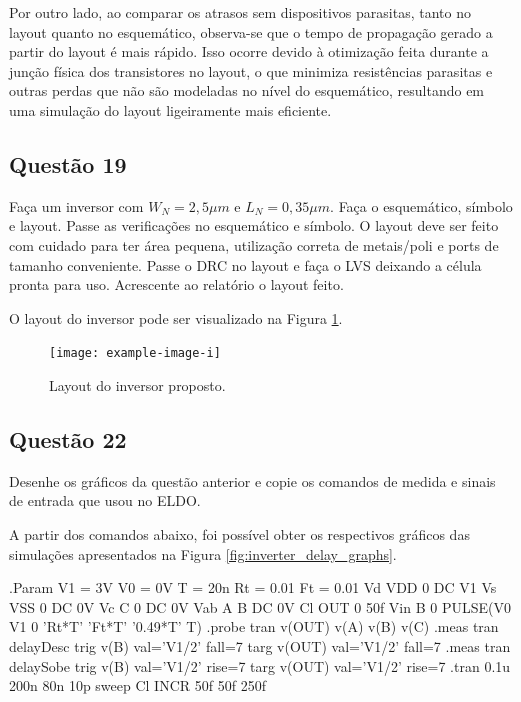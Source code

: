 \documentclass[12pt,a4paper]{article}
\begin{document}
Por outro lado, ao comparar os atrasos sem dispositivos parasitas, tanto no layout quanto no esquemático, observa-se que o tempo de propagação gerado a partir do layout é mais rápido. Isso ocorre devido à otimização feita durante a junção física dos transistores no layout, o que minimiza resistências parasitas e outras perdas que não são modeladas no nível do esquemático, resultando em uma simulação do layout ligeiramente mais eficiente.

\subsection*{Questão 19}

Faça um inversor com $W_N = 2,5 \mu m$ e $L_N = 0,35 \mu m$. Faça o esquemático, símbolo e layout. Passe as verificações no esquemático e símbolo. O layout deve ser feito com cuidado para ter área pequena, utilização correta de metais/poli e ports de tamanho conveniente. Passe o DRC no layout e faça o LVS deixando a célula pronta para uso. Acrescente ao relatório o layout feito.

O layout do inversor pode ser visualizado na Figura \ref{fig:inverter_layout}.

\begin{figure}[H]
    \centering
    \texttt{[image: example-image-i]}
    \caption{Layout do inversor proposto.}
    \label{fig:inverter_layout}
\end{figure}

\subsection*{Questão 22}

Desenhe os gráficos da questão anterior e copie os comandos de medida e sinais de entrada que usou no ELDO.

A partir dos comandos abaixo, foi possível obter os respectivos gráficos das simulações apresentados na Figura \ref{fig:inverter_delay_graphs}.

\begin{codeblock}[title={Comandos ELDO para Inversor}, label={lst:inverter_eldo_commands}, listing options={language=TeX}]
.Param V1 = 3V V0 = 0V T = 20n Rt = 0.01 Ft = 0.01
Vd VDD 0 DC V1
Vs VSS 0 DC 0V
Vc C 0 DC 0V
Vab A B DC 0V
Cl OUT 0 50f
Vin B 0 PULSE(V0 V1 0 'Rt*T' 'Ft*T' '0.49*T' T)
.probe tran v(OUT) v(A) v(B) v(C)
.meas tran delayDesc trig v(B) val='V1/2' fall=7 targ v(OUT) val='V1/2'
fall=7
.meas tran delaySobe trig v(B) val='V1/2' rise=7 targ v(OUT) val='V1/2'
rise=7
.tran 0.1u 200n 80n 10p sweep Cl INCR 50f 50f 250f
\end{codeblock}
\end{document}
